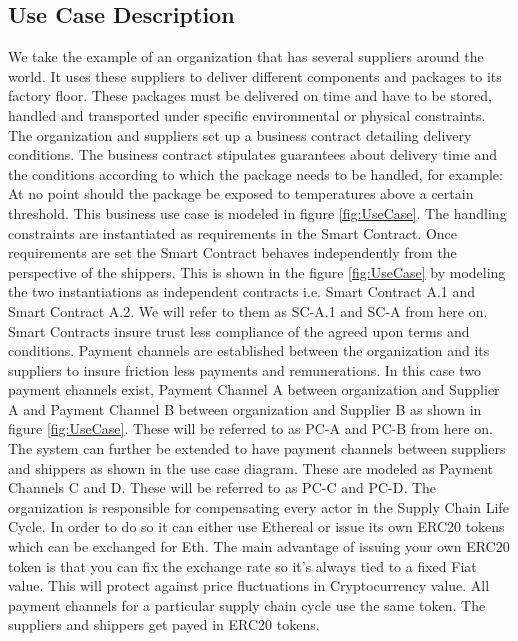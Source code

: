 \subsection{Use Case Description} \label{ST-Dapp-UC} 
We take the example of an organization that has several suppliers around the world. It uses these suppliers to deliver different components and packages to its factory floor. These packages must be delivered on time and have to be stored, handled and transported under specific environmental or physical constraints. The organization and suppliers set up a business contract detailing delivery conditions. The business contract stipulates guarantees about delivery time and the conditions according to which the package needs to be handled, for example: At no point should the package be exposed to temperatures above a certain threshold.  This business use case is modeled in figure \ref{fig:UseCase}. The handling constraints are instantiated as requirements in the Smart Contract. Once requirements are set the Smart Contract behaves independently from the perspective of the shippers. This is shown in the figure \ref{fig:UseCase} by modeling the two instantiations as independent contracts i.e. Smart Contract A.1 and Smart Contract A.2. We will refer to them as SC-A.1 and SC-A from here on. Smart Contracts insure trust less compliance of the agreed upon terms and conditions. Payment channels are established between the organization and its suppliers to insure friction less payments and remunerations. In this case two payment channels exist, Payment Channel A between organization and Supplier A and Payment Channel B between organization and Supplier B as shown in figure \ref{fig:UseCase}. These will be referred to as PC-A and PC-B from here on. The system can further be extended to have payment channels between suppliers and shippers as shown in the use case diagram. These are modeled as Payment Channels C and D. These will be referred to as PC-C and PC-D. The organization is responsible for compensating every actor in the Supply Chain Life Cycle. In order to do so it can either use Ethereal or issue its own ERC20 tokens which can be exchanged for Eth. The main advantage of issuing your own ERC20 token is that you can fix the exchange rate so it’s always tied to a fixed Fiat value. This will protect against price fluctuations in Cryptocurrency value. All payment channels for a particular supply chain cycle use the same token. The suppliers and shippers get payed in ERC20 tokens.
